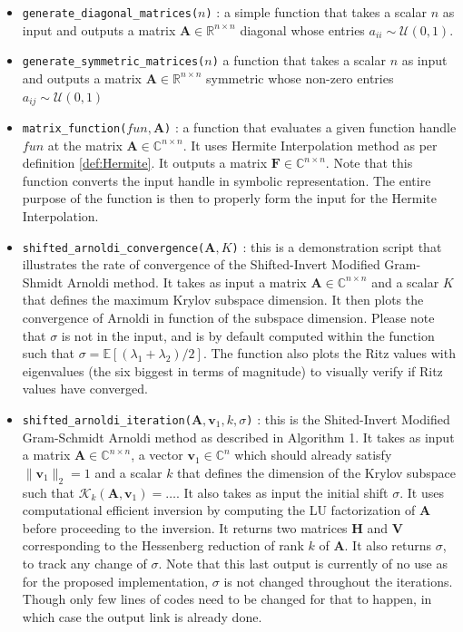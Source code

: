\documentclass[11pt]{article}
\numberwithin{equation}{section}
\begin{document}
\begin{itemize}
    \item \texttt{generate\_diagonal\_matrices($n$)} : a simple function that takes a scalar $n$ as input and outputs a matrix $\mathbf{A}\in\mathbb{R}^{n\times n}$ diagonal whose entries $a_{ii}\sim\mathcal{U}(0,1)$.
    \item \texttt{generate\_symmetric\_matrices($n$)} a function that takes a scalar $n$ as input and outputs a matrix $\mathbf{A}\in\mathbb{R}^{n\times n}$ symmetric whose non-zero entries $a_{ij}\sim\mathcal{U}(0,1)$
    \item \texttt{matrix\_function($fun, \mathbf{A}$)} : a function that evaluates a given function handle $fun$ at the matrix $\mathbf{A}\in\mathbb{C}^{n\times n}$. It uses Hermite Interpolation method as per definition \ref{def:Hermite}. It outputs a matrix $\mathbf{F}\in\mathbb{C}^{n\times n}$. Note that this function converts the input handle in symbolic representation. The entire purpose of the function is then to properly form the input for the Hermite Interpolation.
    \item \texttt{shifted\_arnoldi\_convergence($\mathbf{A},K$)} : this is a demonstration script that illustrates the rate of convergence of the Shifted-Invert Modified Gram-Shmidt Arnoldi method. It takes as input a matrix $\mathbf{A}\in\mathbb{C}^{n\times n}$ and a scalar $K$ that defines the maximum Krylov subspace dimension. It then plots the convergence of Arnoldi in function of the subspace dimension. Please note that $\sigma$ is not in the input, and is by default computed within the function such that $\sigma=\mathbb{E}[(\lambda_1+\lambda_2)/2]$. The function also plots the Ritz values with eigenvalues (the six biggest in terms of magnitude) to visually verify if Ritz values have converged.
    \item \texttt{shifted\_arnoldi\_iteration($\mathbf{A},\mathbf{v}_1,k,\sigma$)} : this is the Shited-Invert Modified Gram-Schmidt Arnoldi method as described in Algorithm 1. It takes as input a matrix $\mathbf{A}\in\mathbb{C}^{n\times n}$, a vector $\mathbf{v}_1\in\mathbb{C}^n$ which should already satisfy $\|\mathbf{v}_1\|_2 = 1$ and a scalar $k$ that defines the dimension of the Krylov subspace such that $\mathcal{K}_k(\mathbf{A},\mathbf{v}_1) = \dots$. It also takes as input the initial shift $\sigma$. It uses computational efficient inversion by computing the LU factorization of $\mathbf{A}$ before proceeding to the inversion. It returns two matrices $\mathbf{H}$ and $\mathbf{V}$ corresponding to the Hessenberg reduction of rank $k$ of $\mathbf{A}$. It also returns $\sigma$, to track any change of $\sigma$. Note that this last output is currently of no use as for the proposed implementation, $\sigma$ is not changed throughout the iterations. Though only few lines of codes need to be changed for that to happen, in which case the output link is already done.

\end{itemize}
\end{document}
